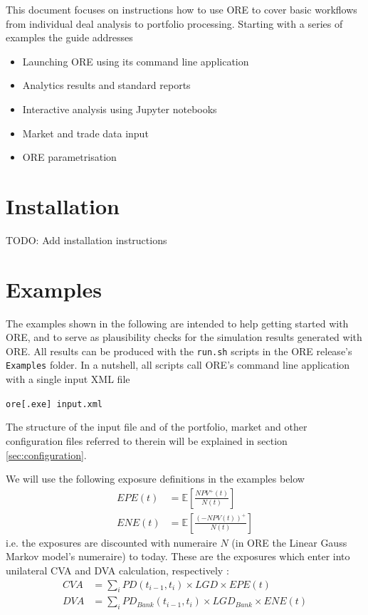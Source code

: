 \documentclass[12pt, a4paper]{article}
\newcommand\E{\ensuremath{\mathbb{E}}}
\newcommand{\CVA}{\mathit{CVA}}
\newcommand{\DVA}{\mathit{DVA}}
\newcommand{\EPE}{\mathit{EPE}}
\newcommand{\ENE}{\mathit{ENE}}
\newcommand{\PD}{\mathit{PD}}
\newcommand{\LGD}{\mathit{LGD}}
\begin{document}
\vspace{1em}

This document focuses on instructions how to use ORE to cover basic workflows from individual deal analysis to portfolio processing. Starting with a series of examples the guide addresses
\begin{itemize}
\setlength{\itemsep}{0pt}
\item Launching ORE using its command line application
\item Analytics results and standard reports
\item Interactive analysis using Jupyter notebooks 
\item Market and trade data input
\item ORE parametrisation
\end{itemize}

\newpage

\section{Installation}

TODO: Add installation instructions

\section{Examples}\label{sec:examples}

The examples shown in the following are intended to help getting started with ORE, and to serve as plausibility checks for the simulation results generated with ORE.
All results can be produced with the {\tt run.sh} scripts in the ORE release's {\tt Examples} folder. In a nutshell, all scripts call ORE's command line application with a single input XML file

\medskip
\centerline{\tt ore[.exe] input.xml}
\medskip

The structure of the input file and of the portfolio, market and other configuration files referred to therein will be explained in section \ref{sec:configuration}. 

\medskip
We will use the following exposure definitions in the examples below
\begin{align*}
\EPE(t) &= \E\left[ \frac{NPV^+(t)}{N(t)} \right] \\
\ENE(t) &= \E\left[ \frac{(-NPV(t))^+}{N(t)} \right]
\end{align*}
i.e. the exposures are discounted with numeraire $N$ (in ORE the Linear Gauss Markov model's numeraire) to today. These are the exposures which enter into unilateral CVA and DVA calculation, respectively \cite{Lichters}:
\begin{align*}
\CVA &= \sum_{i} \PD(t_{i-1},t_i)\times\LGD\times \EPE(t) \\
\DVA &= \sum_{i} \PD_{Bank}(t_{i-1},t_i)\times\LGD_{Bank}\times \ENE(t)
\end{align*}
\end{document}
